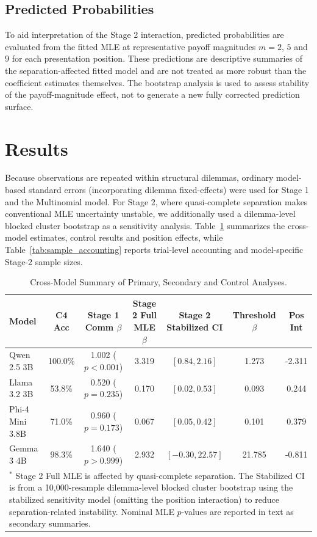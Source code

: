 \documentclass[10pt,journal,compsoc]{IEEEtran}
\begin{document}
\subsection{Predicted Probabilities}
To aid interpretation of the Stage 2 interaction, predicted probabilities are evaluated from the fitted MLE at representative payoff magnitudes $m=2$, $5$ and $9$ for each presentation position. These predictions are descriptive summaries of the separation-affected fitted model and are not treated as more robust than the coefficient estimates themselves. The bootstrap analysis is used to assess stability of the payoff-magnitude effect, not to generate a new fully corrected prediction surface.

\section{Results}
\label{sec:results}

Because observations are repeated within structural dilemmas, ordinary model-based standard errors (incorporating dilemma fixed-effects) were used for Stage 1 and the Multinomial model. For Stage 2, where quasi-complete separation makes conventional MLE uncertainty unstable, we additionally used a dilemma-level blocked cluster bootstrap as a sensitivity analysis. Table~\ref{tab:results_summary} summarizes the cross-model estimates, control results and position effects, while Table~\ref{tab:sample_accounting} reports trial-level accounting and model-specific Stage-2 sample sizes.

\begin{table}[!htbp]
\centering
\caption{Cross-Model Summary of Primary, Secondary and Control Analyses.}
\label{tab:results_summary}
\begin{tabular}{@{}lcccccc@{}}
\toprule
\textbf{Model} & \textbf{C4 Acc} & \textbf{Stage 1 Comm $\beta$} & \textbf{Stage 2 Full MLE $\beta$} & \textbf{Stage 2 Stabilized CI} & \textbf{Threshold $\beta$} & \textbf{Pos Int} \\
\midrule
Qwen 2.5 3B & 100.0\% & 1.002 ($p<0.001$) & 3.319 & $[0.84, 2.16]$ & 1.273 & -2.311 \\
Llama 3.2 3B & 53.8\% & 0.520 ($p=0.235$) & 0.170 & $[0.02, 0.53]$ & 0.093 & 0.244 \\
Phi-4 Mini 3.8B & 71.0\% & 0.960 ($p=0.173$) & 0.067 & $[0.05, 0.42]$ & 0.101 & 0.379 \\
Gemma 3 4B & 98.3\% & 1.640 ($p>0.999$) & 2.932 & $[-0.30, 22.57]$ & 21.785 & -0.811 \\
\bottomrule
\multicolumn{7}{p{\textwidth}}{\footnotesize $^*$ Stage 2 Full MLE is affected by quasi-complete separation. The Stabilized CI is from a 10,000-resample dilemma-level blocked cluster bootstrap using the stabilized sensitivity model (omitting the position interaction) to reduce separation-related instability. Nominal MLE $p$-values are reported in text as secondary summaries.}
\end{tabular}
\end{table}
\end{document}
